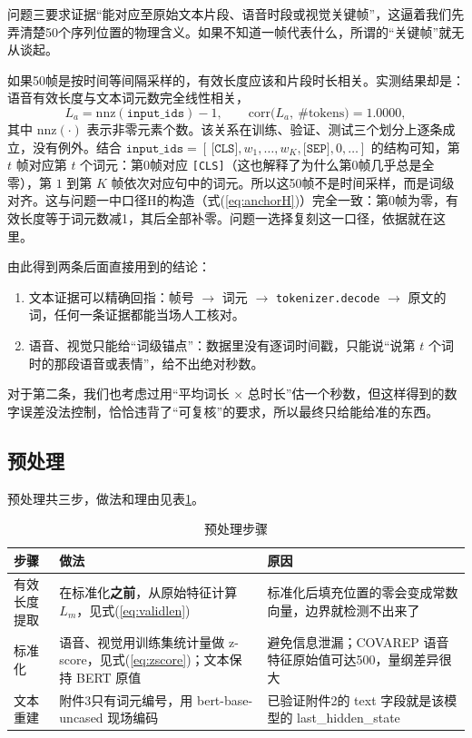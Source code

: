 问题三要求证据“能对应至原始文本片段、语音时段或视觉关键帧”，这逼着我们先弄清楚50个序列位置的物理含义。如果不知道一帧代表什么，所谓的“关键帧”就无从谈起。

如果50帧是按时间等间隔采样的，有效长度应该和片段时长相关。实测结果却是：语音有效长度与文本词元数完全线性相关，
\begin{equation}\label{eq:align}
L_a=\mathrm{nnz}(\texttt{input\_ids})-1,\qquad \mathrm{corr}\big(L_a,\ \#\mathrm{tokens}\big)=1.0000,
\end{equation}
其中 $\mathrm{nnz}(\cdot)$ 表示非零元素个数。该关系在训练、验证、测试三个划分上逐条成立，没有例外。结合 $\texttt{input\_ids}=[\,\texttt{[CLS]},w_1,\dots,w_K,\texttt{[SEP]},0,\dots]$ 的结构可知，第 $t$ 帧对应第 $t$ 个词元：第0帧对应 \texttt{[CLS]}（这也解释了为什么第0帧几乎总是全零），第 $1$ 到第 $K$ 帧依次对应句中的词元。所以这50帧不是时间采样，而是词级对齐。这与问题一中口径H的构造（式(\ref{eq:anchorH})）完全一致：第0帧为零，有效长度等于词元数减1，其后全部补零。问题一选择复刻这一口径，依据就在这里。

由此得到两条后面直接用到的结论：
\begin{enumerate}[label=(\arabic*)]
\item 文本证据可以精确回指：帧号 $\to$ 词元 $\to$ \texttt{tokenizer.decode} $\to$ 原文的词，任何一条证据都能当场人工核对。
\item 语音、视觉只能给“词级锚点”：数据里没有逐词时间戳，只能说“说第 $t$ 个词时的那段语音或表情”，给不出绝对秒数。
\end{enumerate}
对于第二条，我们也考虑过用“平均词长 $\times$ 总时长”估一个秒数，但这样得到的数字误差没法控制，恰恰违背了“可复核”的要求，所以最终只给能给准的东西。

\subsection{预处理}\label{sec:prep}

预处理共三步，做法和理由见表\ref{tab:prep}。

\begin{table}[htbp]
\centering
\caption{预处理步骤}
\label{tab:prep}
\begin{tabular}{>{\raggedright\arraybackslash}p{2.1cm}>{\raggedright\arraybackslash}p{5.6cm}>{\raggedright\arraybackslash}p{5.6cm}}
\toprule
步骤 & 做法 & 原因 \\
\midrule
有效长度提取 & 在标准化\textbf{之前}，从原始特征计算 $L_m$，见式(\ref{eq:validlen}) & 标准化后填充位置的零会变成常数向量，边界就检测不出来了 \\
标准化 & 语音、视觉用训练集统计量做 z-score，见式(\ref{eq:zscore})；文本保持 BERT 原值 & 避免信息泄漏；COVAREP\cite{degottex2014covarep} 语音特征原始值可达500，量纲差异很大 \\
文本重建 & 附件3只有词元编号，用 bert-base-uncased\cite{devlin2019bert} 现场编码 & 已验证附件2的 text 字段就是该模型的 last\_hidden\_state \\
\bottomrule
\end{tabular}
\end{table}

